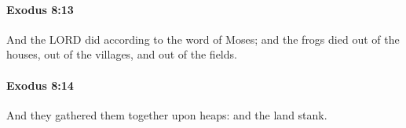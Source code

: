 		\paragraph{Exodus 8:13} %
			\label{EXODUS-8-13}

			And the LORD did according to the word of Moses; and the frogs died out of the houses, out of the villages, and out of the fields.


		\paragraph{Exodus 8:14} %
			\label{EXODUS-8-14}

			And they gathered them together upon heaps: and the land stank.


